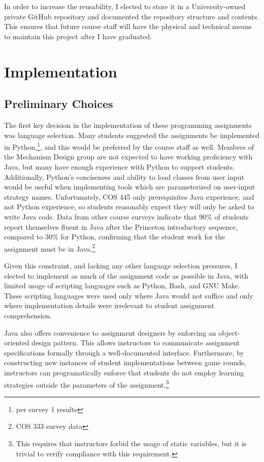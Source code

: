 \documentclass[pageno]{jpaper}
\begin{document}
In order to increase the reusability, I elected to store it in a University-owned private GitHub repository and documented the repository structure and contents.
This ensures that future course staff will have the physical and technical means to maintain this project after I have graduated.

\section*{Implementation}
\subsection*{Preliminary Choices}
The first key decision in the implementation of these programming assignments was language selection.
Many students suggested the assignments be implemented in Python,\footnote{per survey 1 results}, and this would be preferred by the course staff as well.
Members of the Mechanism Design group are not expected to have working proficiency with Java, but many have enough experience with Python to support students.
Additionally, Python's conciseness and ability to load classes from user input would be useful when implementing tools which are parameterized on user-input strategy names.
Unfortunately, COS 445 only prerequisites Java experience, and not Python experience, so students reasonably expect they will only be asked to write Java code.
Data from other course surveys indicate that 90\% of students report themselves fluent in Java after the Princeton introductory sequence, compared to 30\% for Python, confirming that the student work for the assignment must be in Java.\footnote{COS 333 survey data}

Given this constraint, and lacking any other language selection pressures, I elected to implement as much of the assignment code as possible in Java, with limited usage of scripting languages such as Python, Bash, and GNU Make.
These scripting languages were used only where Java would not suffice and only where implementation details were irrelevant to student assignment comprehension.

Java also offers convenience to assignment designers by enforcing an object-oriented design pattern.
This allows instructors to communicate assignment specifications formally through a well-documented interface.
Furthermore, by constructing new instances of student implementations between game rounds, instructors can programatically enforce that students do not employ learning strategies outside the parameters of the assignment.\footnote{This requires that instructors forbid the usage of static variables, but it is trivial to verify compliance with this requirement.}
\end{document}

